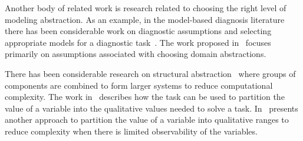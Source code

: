 Another body of related work is research related to choosing the right level of
modeling abstraction. As an example, in the model-based diagnosis literature
there has been considerable work on diagnostic assumptions and selecting appropriate
models for a diagnostic task~\citep{struss1992s}. The work proposed in~\citep{de2007dynamic}
focuses primarily on assumptions associated with choosing domain abstractions.

There has been considerable research on structural
abstraction~\citep{chittaro2004hierarchical,hamscher1990xde} where
groups of components are combined to form larger systems to reduce
computational complexity. The work in~\citep{sachenbacher2005task}
describes how the task can be used to partition the value of a
variable into the qualitative values needed to solve a
task. In~\citep{torta2003automatic} presents another approach to
partition the value of a variable into qualitative ranges to reduce
complexity when there is limited observability of the variables.
